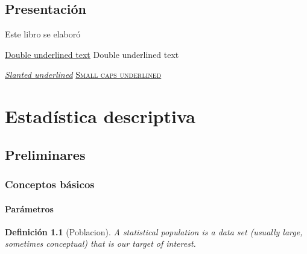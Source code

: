 \documentclass[a4paper]{report}
\newtheorem{defn}[thm]{Definición}
\begin{document}
\renewcommand\listfigurename{Lista de figuras}
\listoffigures

\renewcommand\listtablename{Lista de tablas}
\listoftables
\newpage

\clearpage

\chapter*{Presentación}

Este libro se elaboró


\underline{\underline{Double underlined text}}
{Double underlined text}

\textsl{\underline{Slanted underlined}}
\textsc{\underline{Small caps underlined}}








\part{Estadística descriptiva}
\setcounter{page}{1}

\chapter{Preliminares}

\section{Conceptos básicos}
\subsection{Parámetros}
\begin{defn}[Poblacion]
	A statistical population is a data set (usually large, sometimes conceptual) that is our target of interest.
\end{defn}
\end{document}
